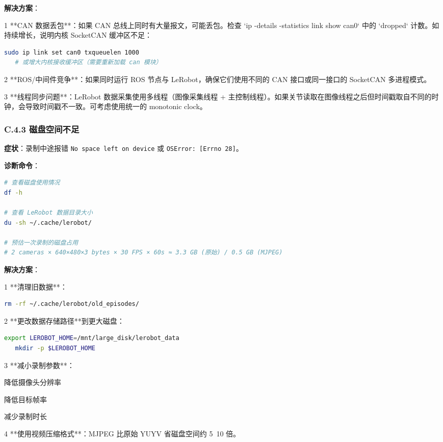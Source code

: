 \documentclass[UTF8,a4paper,11pt]{ctexart}
\begin{document}
{\textbf{解决方案}：
\item[1] **CAN 数据丢包**：如果 CAN 总线上同时有大量报文，可能丢包。检查 `ip -details -statistics link show can0` 中的 `dropped` 计数。如持续增长，说明内核 SocketCAN 缓冲区不足：
\begin{lstlisting}[language=bash]
   sudo ip link set can0 txqueuelen 1000
   # 或增大内核接收缓冲区（需要重新加载 can 模块）
\end{lstlisting}
\item[2] **ROS/中间件竞争**：如果同时运行 ROS 节点与 LeRobot，确保它们使用不同的 CAN 接口或同一接口的 SocketCAN 多进程模式。
\item[3] **线程同步问题**：LeRobot 数据采集使用多线程（图像采集线程 + 主控制线程）。如果关节读取在图像线程之后但时间戳取自不同的时钟，会导致时间戳不一致。可考虑使用统一的 monotonic clock。

\subsubsection{C.4.3 磁盘空间不足}

\textbf{症状}：录制中途报错 \texttt{No space left on device} 或 \texttt{OSError: [Errno 28]}。

\textbf{诊断命令}：
\begin{lstlisting}[language=bash]
# 查看磁盘使用情况
df -h

# 查看 LeRobot 数据目录大小
du -sh ~/.cache/lerobot/

# 预估一次录制的磁盘占用
# 2 cameras × 640×480×3 bytes × 30 FPS × 60s ≈ 3.3 GB (原始) / 0.5 GB (MJPEG)
\end{lstlisting}

\textbf{解决方案}：
\item[1] **清理旧数据**：
\begin{lstlisting}[language=bash]
   rm -rf ~/.cache/lerobot/old_episodes/
\end{lstlisting}
\item[2] **更改数据存储路径**到更大磁盘：
\begin{lstlisting}[language=bash]
   export LEROBOT_HOME=/mnt/large_disk/lerobot_data
   mkdir -p $LEROBOT_HOME
\end{lstlisting}
\item[3] **减小录制参数**：
\item 降低摄像头分辨率
\item 降低目标帧率
\item 减少录制时长
\item[4] **使用视频压缩格式**：MJPEG 比原始 YUYV 省磁盘空间约 5~10 倍。

}
\end{document}
